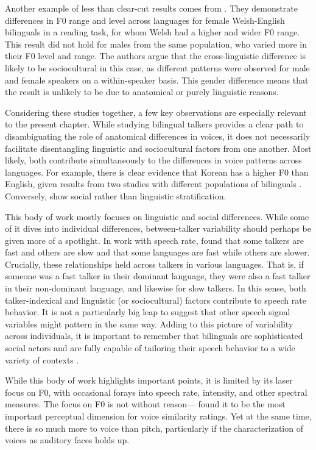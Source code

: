 Another example of less than clear-cut results comes from \citet{ordin_2017_cross}. They demonstrate differences in F0 range and level across languages for female Welsh-English bilinguals in a reading task, for whom Welsh had a higher and wider F0 range. This result did not hold for males from the same population, who varied more in their F0 level and range. The authors argue that the cross-linguistic difference is likely to be sociocultural in this case, as different patterns were observed for male and female speakers on a within-speaker basis. This gender difference means that the result is unlikely to be due to anatomical or purely linguistic reasons.

Considering these studies together, a few key observations are especially relevant to the present chapter. While studying bilingual talkers provides a clear path to disambiguating the role of anatomical differences in voices, it does not necessarily facilitate disentangling linguistic and sociocultural factors from one another. Most likely, both contribute simultaneously to the differences in voice patterns across languages. For example, there is clear evidence that Korean has a higher F0 than English, given results from two studies with different populations of bilinguals \cite{cheng_2020_f0,lee_2017_bilingual}. Conversely, \cite{ordin_2017_cross} show social rather than linguistic stratification. 

This body of work mostly focuses on linguistic and social differences. While some of it dives into individual differences, between-talker variability should perhaps be given more of a spotlight. In work with speech rate, \citet{bradlow_2017_rate} found that some talkers are fast and others are slow and that some languages are fast while others are slower. Crucially, these relationships held across talkers in various languages. That is, if someone was a fast talker in their dominant language, they were also a fast talker in their non-dominant language, and likewise for slow talkers. In this sense, both talker-indexical and linguistic (or sociocultural) factors contribute to speech rate behavior. It is not a particularly big leap to suggest that other speech signal variables might pattern in the same way. Adding to this picture of variability across individuals, it is important to remember that bilinguals are sophisticated social actors and are fully capable of tailoring their speech behavior to a wide variety of contexts \citep{bullock_2009_sociophonetics}. 

While this body of work highlights important points, it is limited by its laser focus on F0, with occasional forays into speech rate, intensity, and other spectral measures. The focus on F0 is not without reason---\citet{perrachione_2019_judgments} found it to be the most important perceptual dimension for voice similarity ratings. Yet at the same time, there is so much more to voice than pitch, particularly if the characterization of voices as auditory faces holds up. 

